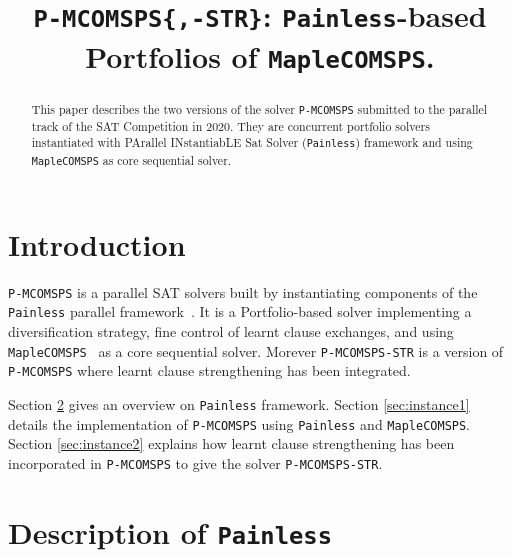 \documentclass[conference]{IEEEtran}
\newcommand{\painless}[0]{\texttt{Painless}\xspace}
\newcommand{\maple}[0]{\texttt{MapleCOMSPS}\xspace}
\newcommand{\pmcomsps}[0]{\texttt{P-MCOMSPS}\xspace}
\newcommand{\preduce}[0]{\texttt{P-MCOMSPS-STR}\xspace}
\begin{document}
\title{\texttt{P-MCOMSPS\{,-STR\}}: \painless-based Portfolios of \maple.}

\author{
}

\maketitle

\begin{abstract}
   This paper describes the two versions of the solver \pmcomsps submitted to
   the parallel track of the SAT Competition in 2020. They are concurrent
   portfolio solvers instantiated with PArallel INstantiabLE Sat Solver
   (\painless) framework and using \maple as core sequential solver.
\end{abstract}

\IEEEpeerreviewmaketitle

\section{Introduction}

\pmcomsps is a parallel SAT solvers built by instantiating components of the
\painless parallel framework~\cite{painless_17}. It is a Portfolio-based solver
implementing a diversification strategy, fine control of learnt clause
exchanges, and using \maple~\cite{maplecomsps_17} as a core sequential solver.
Morever \preduce is a version of \pmcomsps where learnt clause strengthening
has been integrated.

Section \ref{sec:painless} gives an overview on \painless framework. Section
\ref{sec:instance1} details the implementation of \pmcomsps using \painless and
\maple. Section \ref{sec:instance2} explains how learnt clause strengthening
has been incorporated in \pmcomsps to give the solver \preduce.

\section{Description of \painless}
\label{sec:painless}
\end{document}
